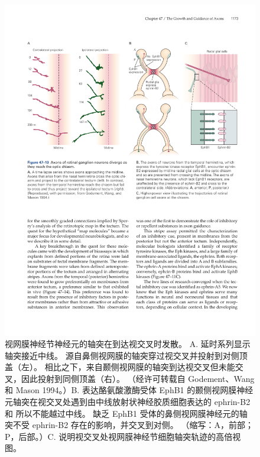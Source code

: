 \begin{figure}[htbp]
	\centering
	\includegraphics[width=0.95\linewidth]{chap47/fig_47_13}
	\caption{视网膜神经节神经元的轴突在到达视交叉时发散。 A. 延时系列显示轴突接近中线。 源自鼻侧视网膜的轴突穿过视交叉并投射到对侧顶盖（左）。 相比之下，来自颞侧视网膜的轴突到达视交叉但未能交叉，因此投射到同侧顶盖（右）。 （经许可转载自 Godement、Wang 和 Mason 1994。）B. 表达酪氨酸激酶受体 EphB1 的颞侧视网膜神经元轴突在视交叉处遇到由中线放射状神经胶质细胞表达的 ephrin-B2 和 所以不能越过中线。 缺乏 EphB1 受体的鼻侧视网膜神经元的轴突不受 ephrin-B2 存在的影响，并交叉到对侧。 （缩写：A，前部；P，后部。）C. 说明视交叉处视网膜神经节细胞轴突轨迹的高倍视图。}
	\label{fig:47_13}
\end{figure}

